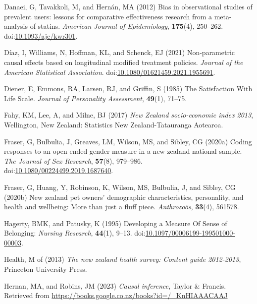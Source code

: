 \documentclass[
  singlecolumn,
  9pt]{article}
\newlength{\cslhangindent}
\newenvironment{CSLReferences}[2] %
 {\begin{list}{}{%
  \setlength{\itemindent}{0pt}
  \setlength{\leftmargin}{0pt}
  \setlength{\parsep}{0pt}
  \ifodd #1
   \setlength{\leftmargin}{\cslhangindent}
   \setlength{\itemindent}{-1\cslhangindent}
  \fi
  \setlength{\itemsep}{#2\baselineskip}}}
 {\end{list}}
\begin{document}
\begin{CSLReferences}{1}{0}
Danaei, G, Tavakkoli, M, and Hernán, MA (2012) Bias in observational
studies of prevalent users: lessons for comparative effectiveness
research from a meta-analysis of statins. \emph{American Journal of
Epidemiology}, \textbf{175}(4), 250--262.
doi:\href{https://doi.org/10.1093/aje/kwr301}{10.1093/aje/kwr301}.

Díaz, I, Williams, N, Hoffman, KL, and Schenck, EJ (2021) Non-parametric
causal effects based on longitudinal modified treatment policies.
\emph{Journal of the American Statistical Association}.
doi:\href{https://doi.org/10.1080/01621459.2021.1955691}{10.1080/01621459.2021.1955691}.

Diener, E, Emmons, RA, Larsen, RJ, and Griffin, S (1985) The
Satisfaction With Life Scale. \emph{Journal of Personality Assessment},
\textbf{49}(1), 71--75.

Fahy, KM, Lee, A, and Milne, BJ (2017) \emph{New Zealand socio-economic
index 2013}, Wellington, New Zealand: Statistics New Zealand-Tatauranga
Aotearoa.

Fraser, G, Bulbulia, J, Greaves, LM, Wilson, MS, and Sibley, CG (2020a)
Coding responses to an open-ended gender measure in a new zealand
national sample. \emph{The Journal of Sex Research}, \textbf{57}(8),
979--986.
doi:\href{https://doi.org/10.1080/00224499.2019.1687640}{10.1080/00224499.2019.1687640}.

Fraser, G, Huang, Y, Robinson, K, Wilson, MS, Bulbulia, J, and Sibley,
CG (2020b) New zealand pet owners{'} demographic characteristics,
personality, and health and wellbeing: More than just a fluff piece.
\emph{Anthrozoös}, \textbf{33}(4), 561578.

Hagerty, BMK, and Patusky, K (1995) Developing a Measure Of Sense of
Belonging: \emph{Nursing Research}, \textbf{44}(1), 9--13.
doi:\href{https://doi.org/10.1097/00006199-199501000-00003}{10.1097/00006199-199501000-00003}.

Health, M of (2013) \emph{The new zealand health survey: Content guide
2012-2013}, Princeton University Press.

Hernan, MA, and Robins, JM (2023) \emph{Causal inference}, Taylor \&
Francis. Retrieved from
\url{https://books.google.co.nz/books?id=/_KnHIAAACAAJ}


\end{CSLReferences}
\end{document}
